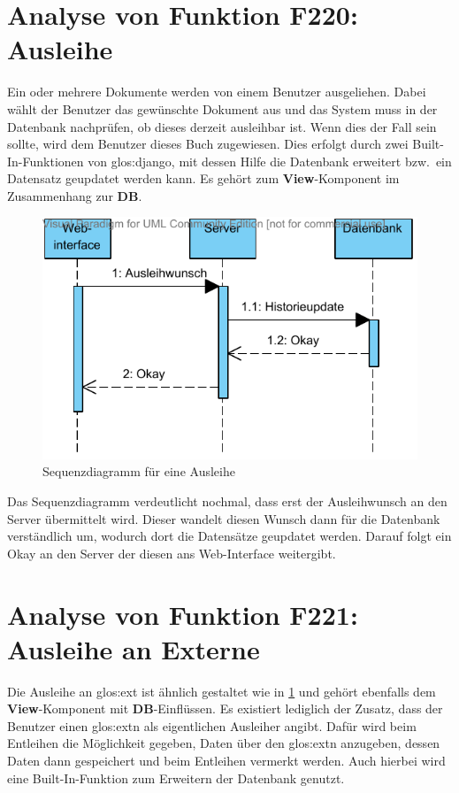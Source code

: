 \section{Analyse von Funktion F220: Ausleihe}
\label{f:220}
Ein oder mehrere Dokumente werden von einem Benutzer ausgeliehen. Dabei wählt 
der Benutzer das gewünschte Dokument aus und das System muss in der Datenbank 
nachprüfen, ob dieses derzeit ausleihbar ist. Wenn dies der Fall sein sollte, 
wird dem Benutzer dieses Buch zugewiesen. Dies erfolgt durch zwei 
Built-In-Funktionen von \gls{glos:django}, mit dessen Hilfe die Datenbank 
erweitert bzw.\ ein Datensatz geupdatet werden kann. Es gehört zum 
\textbf{View}-Komponent im Zusammenhang zur \textbf{DB}.

\begin{figure}[H]
\begin{center}
\includegraphics[width=0.6\linewidth]{bilder/seq-uebertragen.pdf}
\caption{Sequenzdiagramm für eine Ausleihe}
\label{fig:220}
\end{center}
\end{figure}

Das Sequenzdiagramm verdeutlicht nochmal, dass erst der Ausleihwunsch an den Server übermittelt wird. Dieser wandelt diesen Wunsch dann für die Datenbank verständlich um, wodurch dort die Datensätze geupdatet werden. Darauf folgt ein Okay an den Server der diesen ans Web-Interface weitergibt.

\section{Analyse von Funktion F221: Ausleihe an Externe}
\label{f:221}
Die Ausleihe an \gls{glos:ext} ist ähnlich gestaltet wie in \ref{f:220} 
 und gehört ebenfalls dem \textbf{View}-Komponent mit 
\textbf{DB}-Einflüssen. Es existiert lediglich der Zusatz, dass der Benutzer 
einen \gls{glos:ext}n als eigentlichen Ausleiher angibt. Dafür wird beim 
Entleihen die Möglichkeit gegeben, Daten über den \gls{glos:ext}n anzugeben, 
dessen Daten dann gespeichert und beim Entleihen vermerkt werden. Auch hierbei 
wird eine Built-In-Funktion zum Erweitern der Datenbank genutzt.

